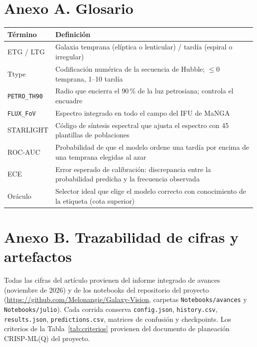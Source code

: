 \appendix
\renewcommand{\thesection}{\Alph{section}}
\section*{Anexo A. Glosario}
\small
\begin{tabularx}{\textwidth}{lY}
\toprule
\textbf{Término} & \textbf{Definición}\\
\midrule
ETG / LTG & Galaxia temprana (elíptica o lenticular) / tardía (espiral o irregular)\\
Ttype & Codificación numérica de la secuencia de Hubble; $\leq0$ temprana, 1--10 tardía\\
\texttt{PETRO\_TH90} & Radio que encierra el 90\,\% de la luz petrosiana; controla el encuadre\\
\texttt{FLUX\_FoV} & Espectro integrado en todo el campo del IFU de MaNGA\\
STARLIGHT & Código de síntesis espectral que ajusta el espectro con 45 plantillas de poblaciones\\
ROC-AUC & Probabilidad de que el modelo ordene una tardía por encima de una temprana elegidas al azar\\
ECE & Error esperado de calibración: discrepancia entre la probabilidad predicha y la frecuencia observada\\
Oráculo & Selector ideal que elige el modelo correcto con conocimiento de la etiqueta (cota superior)\\
\bottomrule
\end{tabularx}
\normalsize

\section*{Anexo B. Trazabilidad de cifras y artefactos}
Todas las cifras del artículo provienen del informe integrado de avances (noviembre de 2026) y de los notebooks del repositorio del proyecto (\url{https://github.com/Melonangie/Galaxy-Vision}, carpetas \texttt{Notebooks/avances} y \texttt{Notebooks/julio}). Cada corrida conserva \texttt{config.json}, \texttt{history.csv}, \texttt{results.json}, \texttt{predictions.csv}, matrices de confusión y checkpoints. Los criterios de la Tabla~\ref{tab:criterios} provienen del documento de planeación CRISP-ML(Q) del proyecto.

